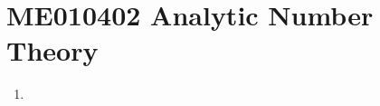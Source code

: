 
\chapter{ME010402 Analytic Number Theory}
\begin{enumerate}[label=Week \arabic*]
	\item 
\end{enumerate}
